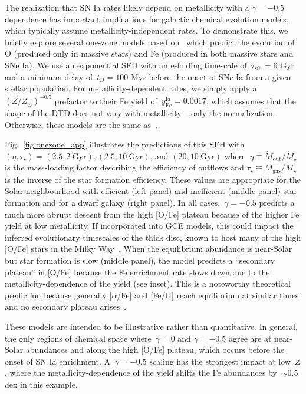 \documentclass[foo.tex]{subfiles}
\begin{document}
The realization that SN Ia rates likely depend on metallicity with a
$\gamma = -0.5$ dependence has important implications for galactic chemical
evolution models, which typically assume metallicity-independent rates.
To demonstrate this, we briefly explore several one-zone models based
on~\citet{Johnson2020} which predict the evolution of O (produced only in
massive stars) and Fe (produced in both massive stars and SNe Ia).
We use an exponential SFH with an e-folding timescale of~$\tau_\text{sfh} = 6$
Gyr and a minimum delay of~$t_\text{D} = 100$ Myr before the onset of SNe Ia
from a given stellar population.
For metallicity-dependent rates, we simply apply a~$(Z / Z_\odot)^{-0.5}$
prefactor to their Fe yield of~$y_\text{Fe}^\text{Ia} = 0.0017$, which assumes
that the shape of the DTD does not vary with metallicity -- only the
normalization.
Otherwise, these models are the same as~\citet{Johnson2020}.
\par
Fig.~\ref{fig:onezone_app} illustrates the predictions of this SFH with
$(\eta, \tau_\star) = (2.5, 2~\text{Gyr}), (2.5, 10~\text{Gyr})$, and
$(20, 10~\text{Gyr})$ where~$\eta \equiv \dot{M}_\text{out} / \dot{M}_\star$ is
the mass-loading factor describing the efficiency of outflows and
$\tau_\star \equiv M_\text{gas} / \dot{M}_\star$ is the inverse of the
star formation efficiency.
These values are appropriate for the Solar neighbourhood with efficient (left
panel) and inefficient (middle panel) star formation and for a dwarf galaxy
(right panel).
In all cases,~$\gamma = -0.5$ predicts a much more abrupt descent from the
high [O/Fe] plateau because of the higher Fe yield at low metallicity.
If incorporated into GCE models, this could impact the inferred evolutionary
timescales of the thick disc, known to host many of the high [O/Fe] stars in
the Milky Way~\citep{Hayden2017}.
When the equilibrium abundance is near-Solar but star formation is slow (middle
panel), the model predicts a ``secondary plateau'' in [O/Fe] because the Fe
enrichment rate slows down due to the metallicity-dependence of the yield
(see inset).
This is a noteworthy theoretical prediction because generally
[$\alpha$/Fe] and [Fe/H] reach equilibrium at similar times and no secondary
plateau arises~\citep[e.g.,][]{Weinberg2017}.
\par
These models are intended to be illustrative rather than quantitative.
In general, the only regions of chemical space where~$\gamma = 0$ and
$\gamma = -0.5$ agree are at near-Solar abundances and along the high [O/Fe]
plateau, which occurs before the onset of SN Ia enrichment.
A~$\gamma = -0.5$ scaling has the strongest impact at low~$Z$, where the
metallicity-dependence of the yield shifts the Fe abundances by~$\sim$0.5 dex
in this example.
\end{document}
